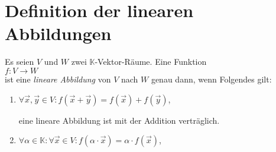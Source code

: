 \section{Definition der linearen Abbildungen}
\begin{Definition}[$\mathcal{L}(V, W)$]
Es seien $V$ und $W$ zwei $\mathbb{K}$-Vektor-R\"{a}ume.  Eine Funktion
\\[0.2cm]
\hspace*{1.3cm}
$f:V \rightarrow W$
\\[0.2cm]
ist eine {\emph{\color{blue}lineare Abbildung}} von $V$ nach $W$ genau dann, wenn Folgendes gilt:
\begin{enumerate}
\item $\forall \vec{x}, \vec{y} \in V: f(\vec{x} + \vec{y}) = f(\vec{x}) + f(\vec{y})$,

      eine lineare Abbildung ist mit der Addition vertr\"{a}glich.
\item $\forall \alpha \in \mathbb{K}: \forall \vec{x} \in V: f(\alpha \cdot \vec{x}) = \alpha \cdot f(\vec{x})$,


\end{enumerate}
\end{Definition}
